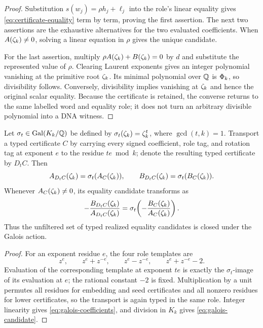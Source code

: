 \begin{proof}
Substitution $s(w_j)=\rho h_j+\ell_j$ into the role's linear equality gives
\eqref{eq:certificate-equality} term by term, proving the first assertion.
The next two assertions are the exhaustive alternatives for the two
evaluated coefficients.  When $A(\zeta_k)\ne0$, solving a linear equation in
$\rho$ gives the unique candidate.

For the last assertion, multiply
$\rho A(\zeta_k)+B(\zeta_k)=0$ by $d$ and substitute the represented value of
$\rho$.  Clearing Laurent exponents gives an integer polynomial vanishing at
the primitive root $\zeta_k$.  Its minimal polynomial over $\mathbb Q$ is $\Phi_k$,
so divisibility follows.  Conversely, divisibility implies vanishing at
$\zeta_k$ and hence the original scalar equality.  Because the certificate is
retained, the converse returns to the same labelled word and equality role;
it does not turn an arbitrary divisible polynomial into a DNA witness.
\end{proof}

\begin{theorem}
\label{thm:galois-certificate}
Let $\sigma_t\in\operatorname{Gal}(K_k/\mathbb Q)$ be defined by
$\sigma_t(\zeta_k)=\zeta_k^t$, where $\gcd(t,k)=1$.  Transport a typed
certificate $C$ by carrying every signed coefficient, role tag, and rotation
tag at exponent $e$ to the residue $te\bmod k$; denote the resulting typed
certificate by $D_tC$.  Then
\begin{equation}
  A_{D_tC}(\zeta_k)=\sigma_t(A_C(\zeta_k)),\qquad
  B_{D_tC}(\zeta_k)=\sigma_t(B_C(\zeta_k)).                               \label{eq:galois-coefficients}
\end{equation}
Whenever $A_C(\zeta_k)\ne0$, its equality candidate transforms as
\begin{equation}
  -\frac{B_{D_tC}(\zeta_k)}{A_{D_tC}(\zeta_k)}
  =\sigma_t\!\left(-\frac{B_C(\zeta_k)}{A_C(\zeta_k)}\right).            \label{eq:galois-candidate}
\end{equation}
Thus the unfiltered set of typed realized equality candidates is closed under
the Galois action.
\end{theorem}

\begin{proof}
For an exponent residue $e$, the four role templates are
\[
 z^e,\qquad z^e+z^{-e},\qquad z^e-z^{-e},\qquad
 z^e+z^{-e}-2.
\]
Evaluation of the corresponding template at exponent $te$ is exactly the
$\sigma_t$-image of its evaluation at $e$; the rational constant $-2$ is
fixed.  Multiplication by a unit permutes all residues for embedding and seed
certificates and all nonzero residues for lower certificates, so the
transport is again typed in the same role.  Integer linearity gives
\eqref{eq:galois-coefficients}, and division in $K_k$ gives
\eqref{eq:galois-candidate}.
\end{proof}

